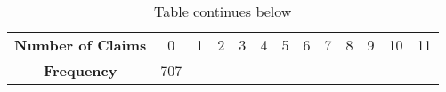\documentclass[]{book}
\theoremstyle{definition}
\theoremstyle{definition}
\theoremstyle{definition}
\theoremstyle{remark}
\begin{document}
\begin{longtable}[]{@{}ccccccccccccc@{}}
\caption{Table continues below}\tabularnewline
\toprule
\begin{minipage}[t]{0.19\columnwidth}\centering\strut
\textbf{Number of Claims}\strut
\end{minipage} & \begin{minipage}[t]{0.05\columnwidth}\centering\strut
0\strut
\end{minipage} & \begin{minipage}[t]{0.05\columnwidth}\centering\strut
1\strut
\end{minipage} & \begin{minipage}[t]{0.04\columnwidth}\centering\strut
2\strut
\end{minipage} & \begin{minipage}[t]{0.04\columnwidth}\centering\strut
3\strut
\end{minipage} & \begin{minipage}[t]{0.04\columnwidth}\centering\strut
4\strut
\end{minipage} & \begin{minipage}[t]{0.04\columnwidth}\centering\strut
5\strut
\end{minipage} & \begin{minipage}[t]{0.03\columnwidth}\centering\strut
6\strut
\end{minipage} & \begin{minipage}[t]{0.03\columnwidth}\centering\strut
7\strut
\end{minipage} & \begin{minipage}[t]{0.03\columnwidth}\centering\strut
8\strut
\end{minipage} & \begin{minipage}[t]{0.03\columnwidth}\centering\strut
9\strut
\end{minipage} & \begin{minipage}[t]{0.04\columnwidth}\centering\strut
10\strut
\end{minipage} & \begin{minipage}[t]{0.04\columnwidth}\centering\strut
11\strut
\end{minipage}\tabularnewline
\begin{minipage}[t]{0.19\columnwidth}\centering\strut
\textbf{Frequency}\strut
\end{minipage} & \begin{minipage}[t]{0.05\columnwidth}\centering\strut
707\strut
\end{minipage} & \begin{minipage}[t]{0.05\columnwidth}\centering\strut

\end{minipage}
\end{longtable}
\end{document}
